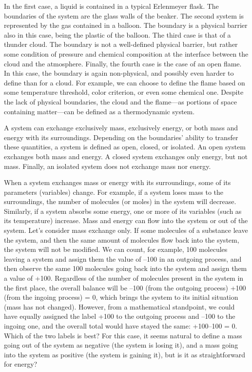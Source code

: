 \documentclass[
  9pt,
]{extbook}
\theoremstyle{definition}
\theoremstyle{definition}
\theoremstyle{definition}
\theoremstyle{definition}
\theoremstyle{remark}
\begin{document}
In the first case, a liquid is contained in a typical Erlenmeyer flask. The boundaries of the system are the glass walls of the beaker. The second system is represented by the gas contained in a balloon. The boundary is a physical barrier also in this case, being the plastic of the balloon. The third case is that of a thunder cloud. The boundary is not a well-defined physical barrier, but rather some condition of pressure and chemical composition at the interface between the cloud and the atmosphere. Finally, the fourth case is the case of an open flame. In this case, the boundary is again non-physical, and possibly even harder to define than for a cloud. For example, we can choose to define the flame based on some temperature threshold, color criterion, or even some chemical one. Despite the lack of physical boundaries, the cloud and the flame---as portions of space containing matter---can be defined as a thermodynamic system.

A system can exchange exclusively mass, exclusively energy, or both mass and energy with its surroundings. Depending on the boundaries' ability to transfer these quantities, a system is defined as open, closed, or isolated. An open system exchanges both mass and energy. A closed system exchanges only energy, but not mass. Finally, an isolated system does not exchange mass nor energy.

When a system exchanges mass or energy with its surroundings, some of its parameters (variables) change. For example, if a system loses mass to the surroundings, the number of molecules (or moles) in the system will decrease. Similarly, if a system absorbs some energy, one or more of its variables (such as its temperature) increase. Mass and energy can flow into the system or out of the system. Let's consider mass exchange only. If some molecules of a substance leave the system, and then the same amount of molecules flow back into the system, the system will not be modified. We can count, for example, 100 molecules leaving a system and assign them the value of --100 in an outgoing process, and then observe the same 100 molecules going back into the system and assign them a value of +100. Regardless of the number of molecules present in the system in the first place, the overall balance will be --100 (from the outgoing process) +100 (from the ingoing process) = 0, which brings the system to its initial situation (mass has not changed). However, from a mathematical standpoint, we could have equally assigned the label +100 to the outgoing process and --100 to the ingoing one, and the overall total would have stayed the same: +100--100 = 0. Which of the two labels is best? For this case, it seems natural to define a mass going out of the system as negative (the system is losing it), and a mass going into the system as positive (the system is gaining it), but is it as straightforward for energy?
\end{document}
